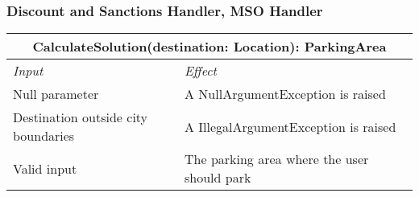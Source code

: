 		
		
		\subsubsection*{Discount and Sanctions Handler, MSO Handler}
			\begin{tabular}{ |l|l| }
				\hline
				\multicolumn{2}{|c|}{CalculateSolution(destination: Location): ParkingArea}\\
				\hline
				\textit{Input} & \textit{Effect}\\ \hline
				Null parameter & A NullArgumentException is raised\\ \hline
				Destination outside city boundaries & A IllegalArgumentException is raised\\ \hline
				Valid input & The parking area where the user should park\\ \hline
			\end{tabular}
			\\
		
		